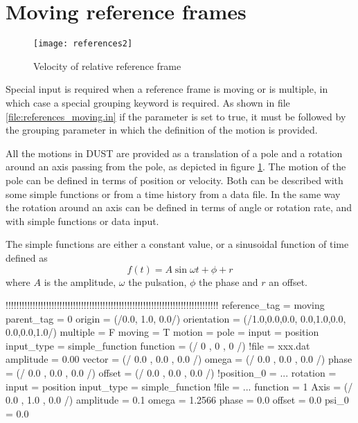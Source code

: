 \section{Moving reference frames}
\begin{figure}[htbp]
    \centering
    \texttt{[image: references2]}
    \caption{Velocity of relative reference frame}
    \label{fig:references2}
    \end{figure}
Special input is required when a reference frame is moving or is multiple, 
in which case a special grouping keyword is required. 
As shown in file \ref{file:references_moving.in} if the parameter  
is set to true, it must be followed by the grouping parameter  
in which the definition of the motion is provided. 

All the motions in DUST are provided as a translation of a pole and a 
rotation around an axis passing from the pole, as depicted in figure 
\ref{fig:references2}. The motion of the pole can be defined in terms 
of position or velocity. Both can be described with some simple functions 
or from a time history from a data file.
In the same way the rotation around an axis can be defined in terms 
of angle or rotation rate, and with simple functions or data input.

The simple functions are either a constant value, or a sinusoidal function 
of time defined as
\begin{equation}
f(t) = A \sin{\omega t + \phi} + r 
\end{equation}
where $A$ is the amplitude, $\omega$ the pulsation, $\phi$ the phase and $r$ an offset. 

\begin{inputfile}[frame=single, caption={references\_moving.in}, 
    label={file:references_moving.in}]
!!!!!!!!!!!!!!!!!!!!!!!!!!!!!!!!!!!!!!!!!!!!!!!!!!!!!!!!!!!!!!!!!!!!!!!!!!!!!!!
reference_tag = moving
parent_tag = 0
origin = (/0.0, 1.0, 0.0/)
orientation = (/1.0,0.0,0.0, 0.0,1.0,0.0, 0.0,0.0,1.0/)
multiple = F
moving = T
motion = {
  pole = {
    input      = position                           
    input_type = simple_function
    function   = (/  0  ,  0  ,  0  /)
    !file       = xxx.dat
    amplitude  = 0.00
    vector     = (/ 0.0 , 0.0 , 0.0 /)
    omega      = (/ 0.0 , 0.0 , 0.0 /)
    phase      = (/ 0.0 , 0.0 , 0.0 /)
    offset     = (/ 0.0 , 0.0 , 0.0 /)
    !position_0 = ...
  }
  rotation   = {
    input      = position
    input_type = simple_function
    !file = ...
    function   =  1      
    Axis       = (/ 0.0 , 1.0 , 0.0 /)  
    amplitude  = 0.1    
    omega      = 1.2566  
    phase      = 0.0  
    offset     = 0.0  
    psi_0      = 0.0           
  }
}
\end{inputfile}

